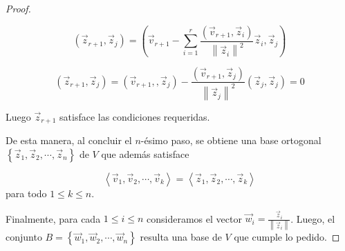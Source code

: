 \begin{theorem}
\begin{proof}
\begin{itemize}
$$(\vec{z}_{r+1}, \vec{z}_j)=( \vec{v}_{r+1} -\sum^{r}_{i=1} \frac {(\vec{v}_{r+1}, \vec{z}_i)} {\left\|\vec{z}_i\right\|^{2}} \vec{z}_i, \vec{z}_j)$$


$$(\vec{z}_{r+1}, \vec{z}_j)=( \vec{v}_{r+1},, \vec{z}_j) - \frac {(\vec{v}_{r+1}, \vec{z}_j)} {\left\|\vec{z}_j\right\|^{2}}( \vec{z}_j, \vec{z}_j)=0$$


\end{itemize}

\bigskip

Luego $\vec{z}_{r+1}$ satisface las condiciones requeridas.

\bigskip

De esta manera, al concluir el $n$-ésimo paso, se obtiene una base ortogonal $\left\{\vec{z}_1,\vec{z}_2,\cdots, \vec{z}_n\right\}$ de $V$ que además satisface

$$\left\langle \vec{v}_1,\vec{v}_2,\cdots, \vec{v}_k \right\rangle  = \left\langle \vec{z}_1,\vec{z}_2,\cdots, \vec{z}_k \right\rangle $$
para todo $1\leq k \leq n$.

\bigskip

Finalmente, para cada $1\leq i \leq n$ consideramos el vector   $\vec{w}_i=\frac {\vec{z}_i} {\left\|\vec{z}_i \right\|}$. Luego, el conjunto $B= \left\{\vec{w}_1,\vec{w}_2,\cdots, \vec{w}_n\right\}$ resulta una base de $V$ que cumple lo pedido.

\end{proof}
\end{theorem}



\bigskip


\bigskip


